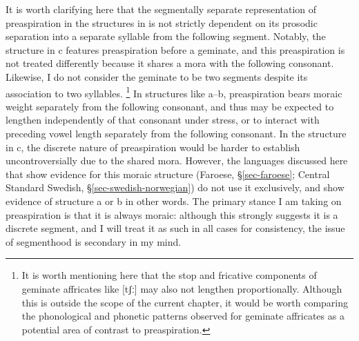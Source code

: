 \documentclass[output=paper,colorlinks,citecolor=brown]{langscibook}
\begin{document}
It is worth clarifying here that the segmentally separate representation of preaspiration in the structures in  is not strictly dependent on its prosodic separation into a separate syllable from the following segment. Notably, the structure in c features preaspiration before a geminate, and this preaspiration is not treated differently because it shares a mora with the following consonant. Likewise, I do not consider the geminate to be two segments despite its association to two syllables.%
\footnote{It is worth mentioning here that the stop and fricative components of geminate affricates like [tʃː] may also not lengthen proportionally. Although this is outside the scope of the current chapter, it would be worth comparing the phonological and phonetic patterns observed for geminate affricates as a potential area of contrast to preaspiration.}
In structures like a--b, preaspiration bears moraic weight separately from the following consonant, and thus may be expected to lengthen independently of that consonant under stress, or to interact with preceding vowel length separately from the following consonant. In the structure in c, the discrete nature of preaspiration would be harder to establish uncontroversially due to the shared mora. However, the languages discussed here that show evidence for this moraic structure (Faroese, \S\ref{sec-faroese}; Central Standard Swedish, \S\ref{sec-swedish-norwegian}) do not use it exclusively, and show evidence of structure a or b in other words. The primary stance I am taking on preaspiration is that it is always moraic: although this strongly suggests it is a discrete segment, and I will treat it as such in all cases for consistency, the issue of segmenthood is secondary in my mind.
\end{document}
